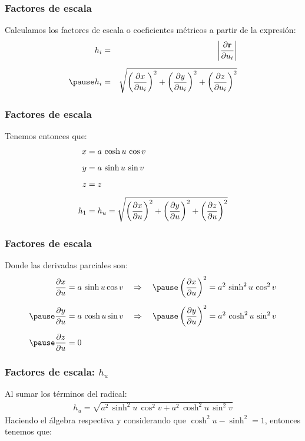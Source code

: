 \documentclass[12pt]{beamer}
\begin{document}
\begin{frame}
\frametitle{Factores de escala}
Calculamos los factores de escala o coeficientes métricos a partir de la expresión:
\pause
\begin{eqnarray*}
h_{i} &=& \abs{\pdv{\vb{r}}{u_{i}}} \\[0.5em] \pause
h_{i} &=& \sqrt{ \left( \pdv{x}{u_{i}} \right)^{2} + \left( \pdv{y}{u_{i}} \right)^{2} + \left( \pdv{z}{u_{i}} \right)^{2}}
\end{eqnarray*}
\end{frame}
\begin{frame}
\frametitle{Factores de escala}
Tenemos entonces que:
\pause
\begin{align*}
x &= a \, \cosh u \, \cos v \\[0.5em]
y &= a \, \sinh u \, \sin v \\[0.5em]
z &= z \\[0.5em]
h_{1} &= h_{u} = \sqrt{ \left( \pdv{x}{u} \right)^{2} + \left( \pdv{y}{u} \right)^{2} + \left( \pdv{z}{u} \right)^{2}}
\end{align*}
\end{frame}
\begin{frame}
\frametitle{Factores de escala}
Donde las derivadas parciales son:
\pause
\begin{eqnarray*}
\begin{aligned}
\pdv{x}{u} &= a \, \sinh u \cos v \hspace{0.35cm} \Rightarrow \hspace{0.35cm} \pause \left( \pdv{x}{u} \right)^{2} = a^{2} \, \sinh^{2} u \, \cos^{2} v \\[0.5em] \pause 
\pdv{y}{u} &= a \, \cosh u \sin v \hspace{0.35cm} \Rightarrow \hspace{0.35cm} \pause \left( \pdv{y}{u} \right)^{2} = a^{2} \, \cosh^{2} u \, \sin^{2} v \\[0.5em] \pause 
\pdv{z}{u} &= 0
\end{aligned}
\end{eqnarray*}
\end{frame}
\begin{frame}
\frametitle{Factores de escala: $h_{u}$}
Al sumar los términos del radical:
\pause
\begin{align*}
h_{u} = \sqrt{a^{2} \, \sinh^{2} u \, \cos^{2} v + a^{2} \, \cosh^{2} u \, \sin^{2} v}
\end{align*}
\pause
Haciendo el álgebra respectiva y considerando que $\cosh^{2} u - \sinh^{2} = 1$, entonces tenemos que:
\end{frame}
\end{document}
